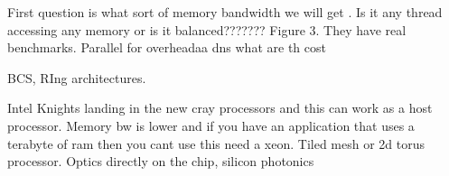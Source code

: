 \documentclass[a4paper,12 pt]{article}
\begin{document}
First question is what sort of memory bandwidth we will get . Is it any thread accessing any memory or is it balanced??????? Figure 3. They have real benchmarks. Parallel for overheadaa dns what are th cost%


BCS, RIng architectures. 

Intel Knights landing in the new cray processors and this can work as a host processor. Memory bw is lower and if you have an application that uses a terabyte of ram then you cant use this need a xeon. Tiled mesh or 2d torus processor. Optics directly on the chip, silicon photonics
\end{document}
